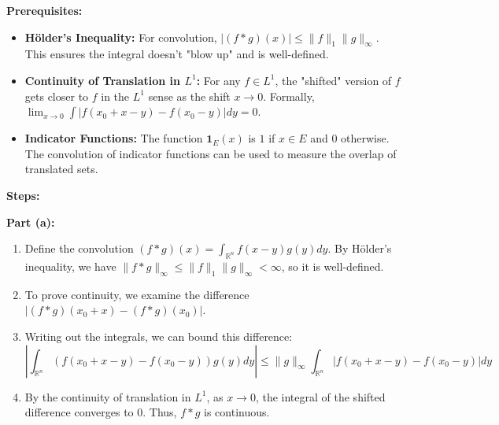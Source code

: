 \begin{solution}
\textbf{Prerequisites:}
\begin{itemize}
    \item \textbf{Hölder's Inequality:} For convolution, $|(f*g)(x)| \leq \|f\|_1 \|g\|_\infty$. This ensures the integral doesn't "blow up" and is well-defined.
    \item \textbf{Continuity of Translation in $L^1$:} For any $f \in L^1$, the "shifted" version of $f$ gets closer to $f$ in the $L^1$ sense as the shift $x \to 0$. Formally, $\lim_{x \to 0} \int |f(x_0+x-y) - f(x_0-y)| dy = 0$.
    \item \textbf{Indicator Functions:} The function $\mathbf{1}_E(x)$ is $1$ if $x \in E$ and $0$ otherwise. The convolution of indicator functions can be used to measure the overlap of translated sets.
\end{itemize}

\textbf{Steps:}

\textbf{Part (a):}
\begin{enumerate}
    \item Define the convolution $(f*g)(x) = \int_{\mathbb{R}^n} f(x-y)g(y)dy$. By Hölder's inequality, we have $\|f*g\|_\infty \leq \|f\|_1 \|g\|_\infty < \infty$, so it is well-defined.
    \item To prove continuity, we examine the difference $|(f*g)(x_0+x) - (f*g)(x_0)|$.
    \item Writing out the integrals, we can bound this difference:
       \[
       \left| \int_{\mathbb{R}^n} (f(x_0+x-y) - f(x_0-y))g(y) dy \right| \leq \|g\|_\infty \int_{\mathbb{R}^n} |f(x_0+x-y) - f(x_0-y)| dy
       \]
    \item By the continuity of translation in $L^1$, as $x \to 0$, the integral of the shifted difference converges to $0$. Thus, $f*g$ is continuous.
\end{enumerate}


\end{solution}
